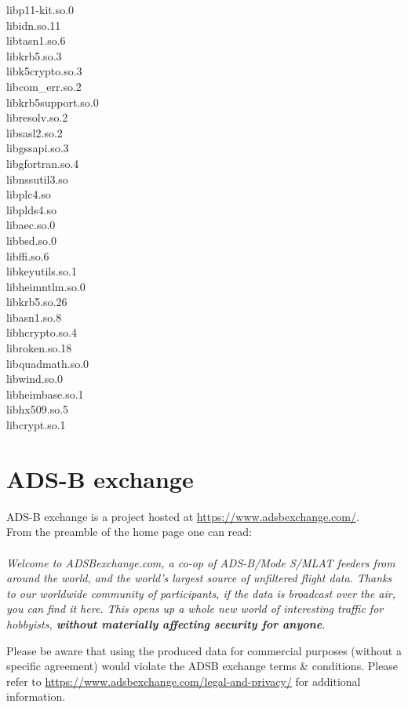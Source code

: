 \begin{multicols}{2}
libp11-kit.so.0 \\
libidn.so.11 \\
libtasn1.so.6 \\
libkrb5.so.3 \\
libk5crypto.so.3 \\
libcom\_err.so.2 \\
libkrb5support.so.0 \\
libresolv.so.2 \\
libsasl2.so.2 \\
libgssapi.so.3 \\
libgfortran.so.4 \\
libnssutil3.so \\
libplc4.so \\
libplds4.so \\
libaec.so.0 \\
libbsd.so.0 \\
libffi.so.6 \\
libkeyutils.so.1 \\
libheimntlm.so.0 \\
libkrb5.so.26 \\
libasn1.so.8 \\
libhcrypto.so.4 \\
libroken.so.18 \\
libquadmath.so.0 \\
libwind.so.0 \\
libheimbase.so.1 \\
libhx509.so.5 \\
libcrypt.so.1
\end{multicols}

\section{ADS-B exchange}
\label{sec:adsbex}

ADS-B exchange is a project hosted at \url{https://www.adsbexchange.com/}. \\

From the preamble of the home page one can read: \\\\
\textit{Welcome to ADSBexchange.com, a co-op of ADS-B/Mode S/MLAT feeders from around the world, and the world's largest source of unfiltered flight data.  Thanks to our worldwide community of participants, if the data is broadcast over the air, you can find it here.  This opens up a whole new world of interesting traffic for hobbyists, \textbf{without materially affecting security for anyone}. \\}

Please be aware that using the produced data for commercial purposes (without a specific agreement) would violate the ADSB exchange terms \& conditions. Please refer to \url{https://www.adsbexchange.com/legal-and-privacy/} for additional information.\\


